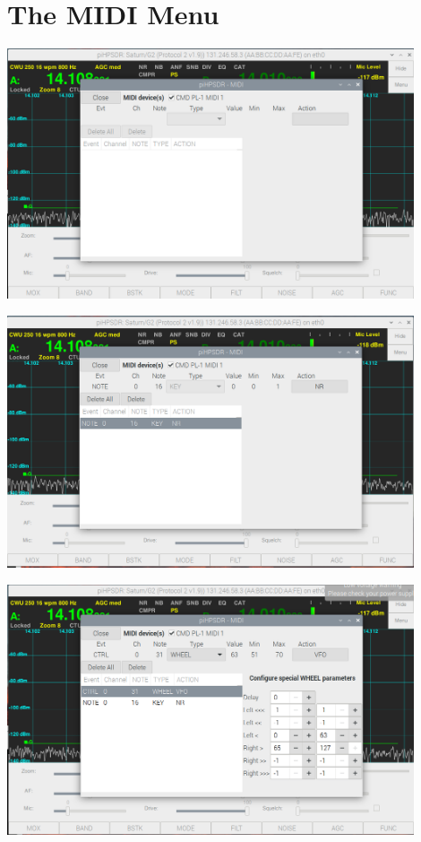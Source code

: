 \documentclass[12pt]{book}
\begin{document}
\section{The MIDI Menu}
\begin{center}
\includegraphics[width=12cm]{MIDImenu1.png}
\end{center}

\begin{center}
\includegraphics[width=12cm]{MIDImenu2.png}
\end{center}

\begin{center}
\includegraphics[width=12cm]{MIDImenu3.png}
\end{center}
 
\end{document}
